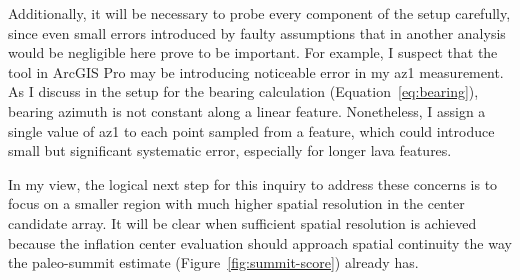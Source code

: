 
Additionally, it will be necessary to probe every component of the setup carefully, since even small errors introduced by faulty assumptions that in another analysis would be negligible here prove to be important. For example, I suspect that the  tool in ArcGIS Pro may be introducing noticeable error in my \acl{az1} measurement. As I discuss in the setup for the \acs{bearing} calculation (Equation~\eqref{eq:bearing}), bearing azimuth is not constant along a linear feature. Nonetheless, I assign a single value of \acs{az1} to each point sampled from a feature, which could introduce small but significant systematic error, especially for longer lava features.

In my view, the logical next step for this inquiry to address these concerns is to focus on a smaller region with much higher spatial resolution in the center candidate array. It will be clear when sufficient spatial resolution is achieved because the inflation center evaluation should approach spatial continuity the way the paleo-summit estimate (Figure~\ref{fig:summit-score}) already has.


